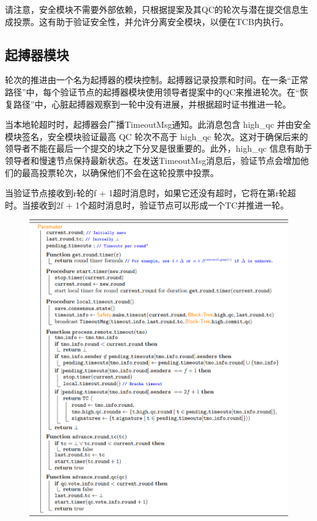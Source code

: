 请注意，安全模块不需要外部依赖，只根据提案及其QC的轮次与潜在提交信息生成投票。这有助于验证安全性，并允许分离安全模块，以便在TCB内执行。

\subsection{起搏器模块}

轮次的推进由一个名为起搏器的模块控制。起搏器记录投票和时间。在一条“正常路径”中，每个验证节点的起搏器模块使用领导者提案中的QC来推进轮次。在“恢复路径”中，心脏起搏器观察到一轮中没有进展，并根据超时证书推进一轮。

当本地轮超时时，起搏器会广播TimeoutMsg通知。此消息包含 high\_qc 并由安全模块签名，安全模块验证最高 QC 轮次不高于 high\_qc 轮次。这对于确保后来的领导者不能在最后一个提交的块之下分叉是很重要的。此外，high\_qc 信息有助于领导者和慢速节点保持最新状态。在发送TimeoutMsg消息后，验证节点会增加他们的最高投票轮次，以确保他们不会在这轮投票中投票。	

当验证节点接收到r轮的f + 1超时消息时，如果它还没有超时，它将在第r轮超时。当接收到2f + 1个超时消息时，验证节点可以形成一个TC并推进一轮。


\begin{figure}[H]
    \centering
    \includegraphics[width=12cm]{figures/code8.png}
\end{figure}


